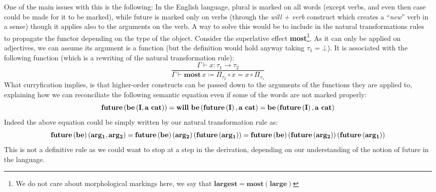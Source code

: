 \documentclass[math, english, info]{cours}
\def\cont{\Gamma\vdash}
\begin{document}
One of the main issues with this is the following:
In the English language, plural is marked on all words (except verbs, and even then case could be made for it to be marked),
while future is marked only on verbs (through the \textit{will + verb} construct which creates a ``\emph{new}'' verb in a sense) though it applies also to the arguments on the verb.
A way to solve this would be to include in the natural transformations rules to propagate the functor depending on the type of the object.
Consider the superlative effect \textbf{most}\footnote{We do not care about morphological markings here, we say that $\mathbf{largest} = \mathbf{most} \left(\mathbf{large}\right)$}.
As it can only be applied on adjectives, we can assume its argument is a function (but the definition would hold anyway taking $\tau_{1} = \bot$).
It is associated with the following function (which is a rewriting of the natural transformation rule):
\begin{equation*}
	\frac{\cont x: \tau_{1} \to \tau_{2}}{\cont \mathbf{most}\, x \coloneqq \Pi_{\tau_{2}} \circ x = x \circ \Pi_{\tau_{1}}}
\end{equation*}
What curryfication implies, is that higher-order constructs can be passed down to the arguments of the functions they are applied to, explaining how we can reconciliate the following semantic equation even if some of the words are not marked properly:
\begin{equation*}
	\bf future\left(be\left( I, a\ cat \right)\right) = will\ be\left( future\left( I \right), a\ cat \right) = be\left( future\left( I \right), a\ cat \right)
\end{equation*}
Indeed the above equation could be simply written by our natural transformation rule as:
\begin{equation*}
	\bf future\left( be \right)\left( arg_{1}, arg_{2} \right) = future\left( be \right)\left( arg_{2} \right)\left( future\left( arg_{1} \right) \right) = future \left( be \right) \left( future \left( arg_{2} \right) \right) \left( future \left( arg_{1} \right) \right)
\end{equation*}
This is not a definitive rule as we could want to stop at a step in the derivation, depending on our understanding of the notion of future in the language.
\end{document}
